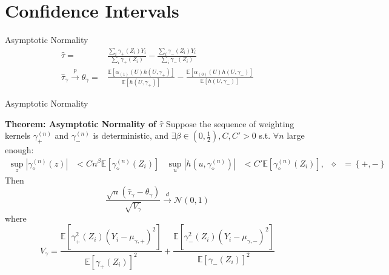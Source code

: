 \section{Confidence Intervals}

 \frame{\sectionpage}

 \begin{frame}{Asymptotic Normality}
    \begin{align*}
        \hat{\tau} =& \frac{\sum_i \gamma_+\left(Z_i\right)Y_i}{\sum_i {\gamma_+\left(Z_i\right)} } - \frac{\sum_i \gamma_-\left(Z_i\right)Y_i}{\sum_i {\gamma_-\left(Z_i\right)} }\\
        \hat{\tau}_{\gamma}\xrightarrow{p}\theta_{\gamma}= & \frac{\mathbb{E}\left[\alpha_{\left(1\right)}\left(U\right)h\left(U,\gamma_{+}\right)\right]}{\mathbb{E}\left[h\left(U,\gamma_{+}\right)\right]}-\frac{\mathbb{E}\left[\alpha_{\left(0\right)}\left(U\right)h\left(U,\gamma_{-}\right)\right]}{\mathbb{E}\left[h\left(U,\gamma_{-}\right)\right]} 
    \end{align*}        
 \end{frame}

 \begin{frame}{Asymptotic Normality}
    \begin{block}{\textbf{Theorem: Asymptotic Normality of $\hat{\tau}$}}
        \small
        Suppose the sequence of weighting kernels $\gamma_{+}^{\left(n\right)}$ and $\gamma_{-}^{\left(n\right)}$ is deterministic, and $\exists\beta\in\left(0,\frac{1}{2}\right), C,C'>0$ s.t. $\forall n$ large enough:
        \begin{align*}
            \sup_{z}\left|\gamma_{\diamond}^{\left(n\right)}\left(z\right)\right|&<Cn^{\beta} \mathbb{E} \left[\gamma_{\diamond}^{\left(n\right)}\left(Z_{i}\right)\right] & \sup_{u}\left|h\left(u,\gamma_{\diamond}^{\left(n\right)}\right)\right|&<C'\mathbb{E}\left[\gamma_{\diamond}^{\left(n\right)}\left(Z_{i}\right)\right], & \diamond&=\left\{ +,-\right\} 
        \end{align*}
        Then 
        $$
        \frac{\sqrt{n}\left(\hat{\tau}_{\gamma}-\theta_{\gamma}\right)}{\sqrt{V_{\gamma}}}\xrightarrow{d}\mathcal{N}\left(0,1\right)
        $$
        where 
        $$
        V_{\gamma}=\frac{\mathbb{E}\left[\gamma_{+}^{2}\left(Z_{i}\right)\left(Y_{i}-\mu_{\gamma,+}\right)^{2}\right]}{\mathbb{E}\left[\gamma_{+}\left(Z_{i}\right)\right]^{2}}+\frac{\mathbb{E}\left[\gamma_{-}^{2}\left(Z_{i}\right)\left(Y_{i}-\mu_{\gamma,-}\right)^{2}\right]}{\mathbb{E}\left[\gamma_{-}\left(Z_{i}\right)\right]^{2}}
        $$
    \end{block}
    
 \end{frame}

